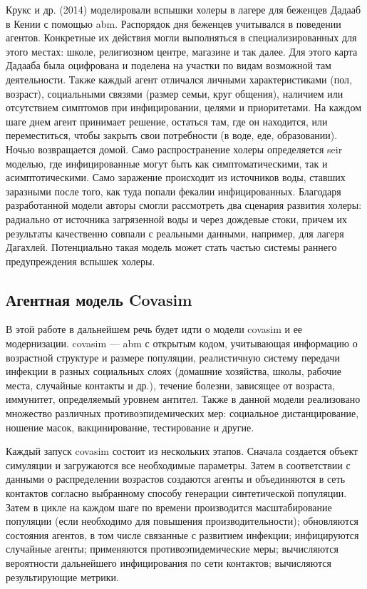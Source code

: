 \documentclass[a4paper,12pt]{article} %
\begin{document}
Крукс и др. (2014) \cite{crooks2014agent} моделировали вспышки холеры в лагере для беженцев Дадааб в Кении с помощью \gls{abm}. Распорядок дня беженцев учитывался в поведении агентов. Конкретные их действия могли выполняться в специализированных для этого местах: школе, религиозном центре, магазине и так далее. Для этого карта Дадааба была оцифрована и поделена на участки по видам возможной там деятельности. Также каждый агент отличался личными характеристиками (пол, возраст), социальными связями (размер семьи, круг общения), наличием или отсутствием симптомов при инфицировании, целями и приоритетами. На каждом шаге днем агент принимает решение, остаться там, где он находится, или переместиться, чтобы закрыть свои потребности (в воде, еде, образовании). Ночью возвращается домой. Само распространение холеры определяется \gls{seir} моделью, где инфицированные могут быть как симптоматическими, так и асимптотическими. Само заражение происходит из источников воды, ставших заразными после того, как туда попали фекалии инфицированных. Благодаря разработанной модели авторы смогли рассмотреть два сценария развития холеры: радиально от источника загрязенной воды и через дождевые стоки, причем их результаты качественно совпали с реальными данными, например, для лагеря Дагахлей. Потенциально такая модель может стать частью системы раннего предупреждения вспышек холеры.




\subsection{Агентная модель Covasim}

В этой работе в дальнейшем речь будет идти о модели \gls{covasim} и ее модернизации. \gls{covasim} --- \gls{abm} с открытым кодом, учитывающая информацию о возрастной структуре и размере популяции, реалистичную систему передачи инфекции в разных социальных слоях (домашние хозяйства, школы, рабочие места, случайные контакты и др.), течение болезни, зависящее от возраста, иммунитет, определяемый уровнем антител. Также в данной модели реализовано множество различных противоэпидемических мер: социальное дистанцирование, ношение масок, вакцинирование, тестирование и другие.

Каждый запуск \gls{covasim} состоит из нескольких этапов. Сначала создается объект симуляции и загружаются все необходимые параметры. Затем в соответствии с данными о распределении возрастов создаются агенты и объединяются в сеть контактов согласно выбранному способу генерации синтетической популяции. Затем в цикле на каждом шаге по времени производится масштабирование популяции (если необходимо для повышения производительности); обновляются состояния агентов, в том числе связанные с развитием инфекции; инфицируются случайные агенты; применяются противоэпидемические меры; вычисляются вероятности дальнейшего инфицирования по сети контактов; вычисляются результирующие метрики.
\end{document}
